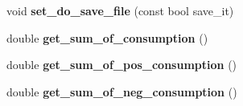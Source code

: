 \begin{DoxyCompactItemize}
\hypertarget{class_staci_a981510ebb2cb58d898fb258063d6f890}{}\label{class_staci_a981510ebb2cb58d898fb258063d6f890} 
void {\bfseries set\+\_\+do\+\_\+save\+\_\+file} (const bool save\+\_\+it)
\item 
\hypertarget{class_staci_a920547ca1fbf6da0fe4b80db05a5e027}{}\label{class_staci_a920547ca1fbf6da0fe4b80db05a5e027} 
double {\bfseries get\+\_\+sum\+\_\+of\+\_\+consumption} ()
\item 
\hypertarget{class_staci_a382120835654d66e09b2975b22809b76}{}\label{class_staci_a382120835654d66e09b2975b22809b76} 
double {\bfseries get\+\_\+sum\+\_\+of\+\_\+pos\+\_\+consumption} ()
\item 
\hypertarget{class_staci_a00fff9cdb062d4101604e5cb0ffa673c}{}\label{class_staci_a00fff9cdb062d4101604e5cb0ffa673c} 
double {\bfseries get\+\_\+sum\+\_\+of\+\_\+neg\+\_\+consumption} ()
\end{DoxyCompactItemize}
